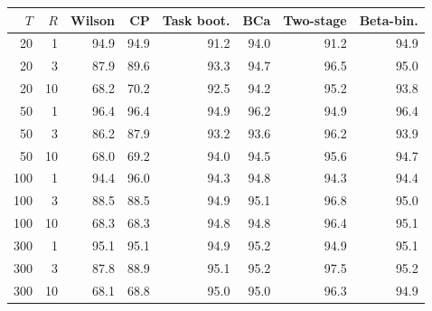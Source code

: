 \begin{tabular}{rrrrrrrr}
\toprule
$T$ & $R$ & Wilson & CP & Task boot. & BCa & Two-stage & Beta-bin. \\
\midrule
20 & 1 & 94.9 & 94.9 & 91.2 & 94.0 & 91.2 & 94.9 \\
20 & 3 & 87.9 & 89.6 & 93.3 & 94.7 & 96.5 & 95.0 \\
20 & 10 & 68.2 & 70.2 & 92.5 & 94.2 & 95.2 & 93.8 \\
50 & 1 & 96.4 & 96.4 & 94.9 & 96.2 & 94.9 & 96.4 \\
50 & 3 & 86.2 & 87.9 & 93.2 & 93.6 & 96.2 & 93.9 \\
50 & 10 & 68.0 & 69.2 & 94.0 & 94.5 & 95.6 & 94.7 \\
100 & 1 & 94.4 & 96.0 & 94.3 & 94.8 & 94.3 & 94.4 \\
100 & 3 & 88.5 & 88.5 & 94.9 & 95.1 & 96.8 & 95.0 \\
100 & 10 & 68.3 & 68.3 & 94.8 & 94.8 & 96.4 & 95.1 \\
300 & 1 & 95.1 & 95.1 & 94.9 & 95.2 & 94.9 & 95.1 \\
300 & 3 & 87.8 & 88.9 & 95.1 & 95.2 & 97.5 & 95.2 \\
300 & 10 & 68.1 & 68.8 & 95.0 & 95.0 & 96.3 & 94.9 \\
\bottomrule
\end{tabular}
